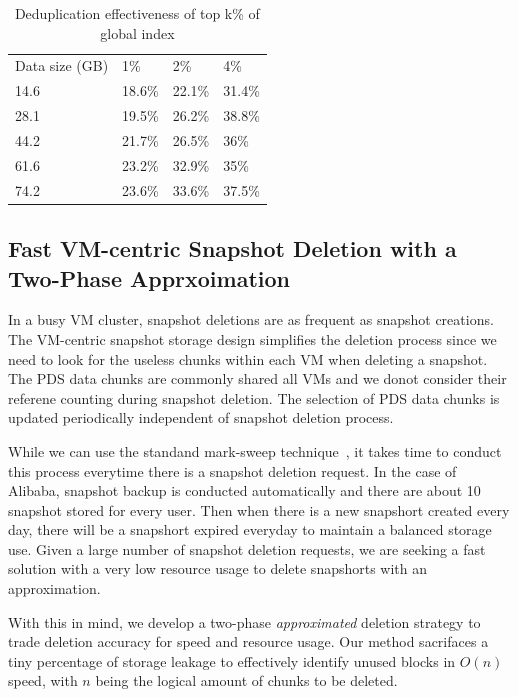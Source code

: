 {\begin{table}
    \begin{tabular}{llll}
    Data size (GB) & 1\%    & 2\%    & 4\%    \\
    14.6           & 18.6\% & 22.1\% & 31.4\% \\
    28.1           & 19.5\% & 26.2\% & 38.8\% \\
    44.2           & 21.7\% & 26.5\% & 36\%   \\
    61.6           & 23.2\% & 32.9\% & 35\%   \\
    74.2           & 23.6\% & 33.6\% & 37.5\% \\
    \end{tabular}
    \caption{Deduplication effectiveness of top k\% of global index}
    \label{tab:cds}
\end{table}

}

\subsection{Fast VM-centric Snapshot Deletion with a Two-Phase  Apprxoimation}

In a busy VM cluster, snapshot deletions are as frequent as snapshot creations.
The VM-centric snapshot storage design simplifies the deletion process since we need to look
for the useless chunks within each VM when deleting a snapshot.
The PDS data chunks are commonly shared all VMs and we donot consider their referene
counting  during snapshot deletion.
The selection of PDS data chunks   is updated periodically independent of snapshot deletion process.

While we can use the standand mark-sweep technique~\cite{mark-sweep}, 
it takes time to conduct this process everytime there is a snapshot deletion request.
In the case of Alibaba, snapshot backup is conducted automatically and there are 
about 10 snapshot stored for  every user. Then when there is
a new snapshort created every day,  there will be  a snapshort expired everyday to maintain
a balanced storage use. Given a large number of snapshot deletion requests, we are seeking
a fast solution with a very low resource usage to delete snapshorts with an approximation.

With this in mind, we develop a two-phase {\em approximated} deletion strategy to trade deletion accuracy for
speed and resource usage. Our method sacrifaces a tiny percentage of storage leakage
to effectively identify unused blocks in $O(n)$ speed, with $n$ being the logical amount of chunks 
to be deleted.


